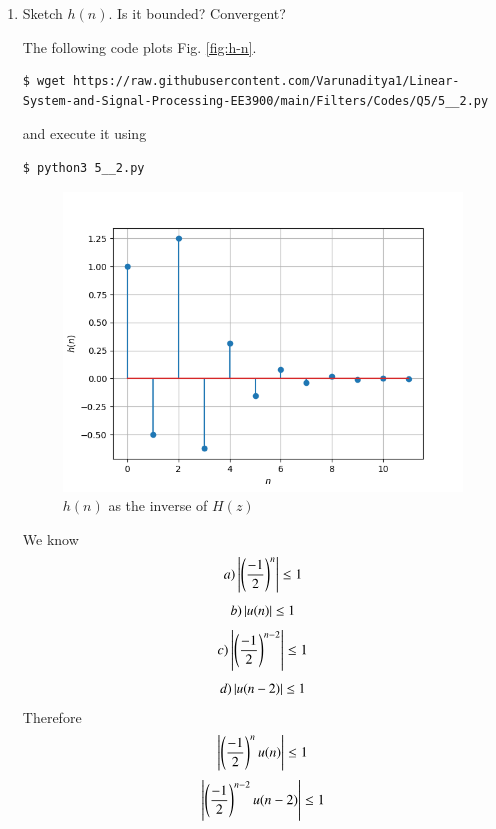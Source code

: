\documentclass[journal,12pt,twocolumn]{IEEEtran}
\renewcommand\thesection{\arabic{section}}
\begin{document}
\begin{enumerate}[label=\thesection.\arabic*]
\item Sketch $h(n)$. Is it bounded? Convergent? 

\solution The following code plots Fig. \eqref{fig:h-n}.
\begin{lstlisting}
$ wget https://raw.githubusercontent.com/Varunaditya1/Linear-System-and-Signal-Processing-EE3900/main/Filters/Codes/Q5/5__2.py
\end{lstlisting}
and execute it using
\begin{lstlisting}
$ python3 5__2.py
\end{lstlisting}

\begin{figure}[!ht]
	\centering
	\includegraphics[width=\columnwidth]{Figures/Q5/5__2.png}
	\caption{$h(n)$ as the inverse of $H(z)$}
	\label{fig:h-n}
\end{figure}
We know 
\begin{equation}
 a)   \left\vert\left( \frac{-1}{2}\right)^n\right\vert \leq 1
\end{equation}
\begin{equation}
 b)   \left\vert u(n)\right\vert \leq 1
\end{equation}
\begin{equation}
 c)   \left\vert\left( \frac{-1}{2}\right)^{n-2}\right\vert \leq 1
\end{equation}
\begin{equation}
 d)   \left\vert u(n-2)\right\vert \leq 1
\end{equation}
Therefore 
\begin{equation}
    \left\vert\left( \frac{-1}{2}\right)^n u(n)\right\vert \leq 1
\end{equation}
\begin{equation}
    \left\vert\left( \frac{-1}{2}\right)^{n-2} u(n-2)\right\vert \leq 1
\end{equation}


\end{enumerate}
\end{document}
